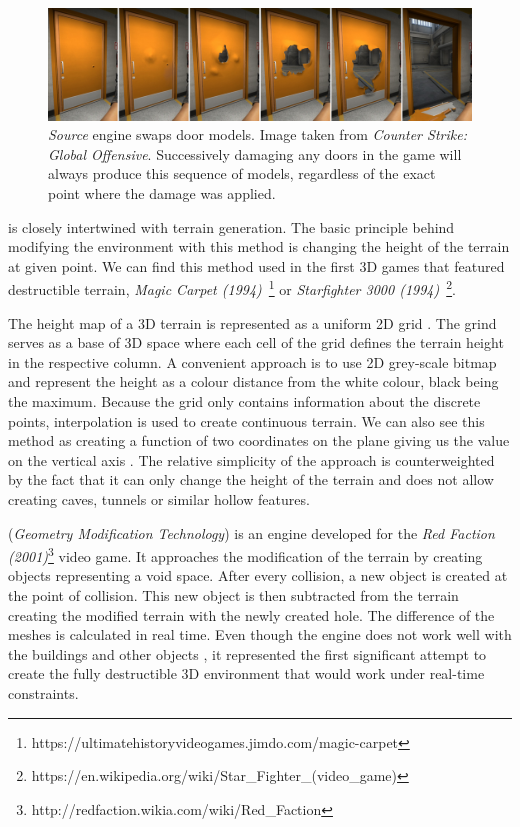 \begin{figure} 
\centering
\includegraphics[width=\textwidth]{img/doors}
\caption{\emph{Source} engine swaps door models. Image taken from \emph{Counter Strike: Global Offensive}. Successively damaging any doors in the game will always produce this sequence of models, regardless of the exact point where the damage was applied.}
\label{fig:doors}
\end{figure}

 is closely intertwined with terrain generation. The basic principle behind modifying the environment with this method is changing the height of the terrain at given point. We can find this method used in the first 3D games that featured destructible terrain, \eg \emph{Magic Carpet (1994)}~\footnote{https://ultimatehistoryvideogames.jimdo.com/magic-carpet} or \emph{Starfighter 3000 (1994)}~\footnote{https://en.wikipedia.org/wiki/Star\_Fighter\_(video\_game)}.

The height map of a 3D terrain is represented as a uniform 2D grid . The grind serves as a base  of 3D space where each cell of the grid defines the terrain height in the respective column. A convenient approach is to use 2D grey-scale bitmap and represent the height as a colour distance from the white colour, black being the maximum. Because the grid only contains information about the discrete points, interpolation is used to create continuous terrain. We can also see  this method as creating a function of two coordinates on the plane giving us the value on the vertical axis . The relative simplicity of the approach is counterweighted by the fact that it can only change the height of the terrain and does not allow creating caves, tunnels or similar hollow features.

 (\emph{Geometry Modification Technology}\cite{geomod}) is an engine developed for the \emph{Red Faction (2001)}\footnote{http://redfaction.wikia.com/wiki/Red\_Faction} video game. It approaches the modification of the terrain by creating objects representing a void  space. After every collision, a new object is created at the point of collision. This new object is then subtracted from the terrain creating the modified terrain with the newly created hole. The difference of the meshes is calculated in real time. Even though the engine does not work well with the buildings and other objects , it represented the first significant attempt to create the fully destructible 3D environment that would work under real-time constraints.

